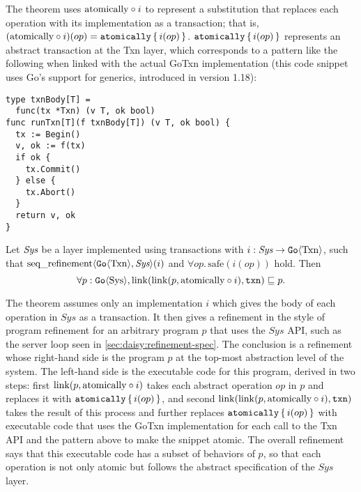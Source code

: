 The theorem uses
$\mathrm{atomically}\circ i$ to represent a substitution that replaces each operation with
its implementation as a transaction; that is,
$(\mathrm{atomically}\circ i)(op) = \mathtt{atomically}\,\{\, i(op) \,\}$. $\mathtt{atomically}\,\{\, i(op) \,\}$ represents an
abstract transaction at the Txn layer, which corresponds to a pattern like the
following when linked with the actual GoTxn implementation (this code snippet
uses Go's support for generics, introduced in version 1.18):

\begin{verbatim}
type txnBody[T] =
  func(tx *Txn) (v T, ok bool)
func runTxn[T](f txnBody[T]) (v T, ok bool) {
  tx := Begin()
  v, ok := f(tx)
  if ok {
    tx.Commit()
  } else {
    tx.Abort()
  }
  return v, ok
}
\end{verbatim}

\begin{theorem}
  Let $\textit{Sys}$ be a layer implemented using transactions with
$i : \textit{Sys} \to \mathtt{Go}\langle \mathrm{Txn} \rangle$, such that
$\operatorname{seq\_refinement}\langle \mathtt{Go}\langle \mathrm{Txn} \rangle, \textit{Sys} \rangle(i)$ and
$\forall op.\, \mathrm{safe}(i(op))$ hold. Then
\[
  \forall p : \mathtt{Go}\langle \mathrm{Sys} \rangle, \mathrm{link}(\mathrm{link}(p, \mathrm{atomically}\circ i), \texttt{txn}) \sqsubseteq p.
\]
\label{thm:gotxn-transfer}
\end{theorem}

The theorem assumes only an implementation $i$ which gives the body of each
operation in $\mathit{Sys}$ as a transaction. It then gives a refinement in the
style of program refinement for an arbitrary program $p$ that uses the
$\mathit{Sys}$ API, such as the server loop seen in
\cref{sec:daisy:refinement-spec}. The conclusion is a refinement whose
right-hand side is the program $p$ at the top-most abstraction level of the
system. The left-hand side is the executable code for this program, derived in
two steps: first $\mathrm{link}(p, \mathrm{atomically}\circ i)$ takes each abstract operation
$op$ in $p$ and replaces it with $\mathtt{atomically}\,\{\, i(op) \,\}$, and second
$\mathrm{link}(\mathrm{link}(p, \mathrm{atomically}\circ i), \texttt{txn})$ takes the result of this process and
further replaces $\mathtt{atomically}\,\{\, i(op) \,\}$ with executable code that uses the GoTxn
implementation for each call to the Txn API and the  pattern above to
make the snippet atomic. The overall refinement says that this executable code
has a subset of behaviors of $p$, so that each operation is not only atomic but
follows the abstract specification of the $\mathit{Sys}$ layer.


